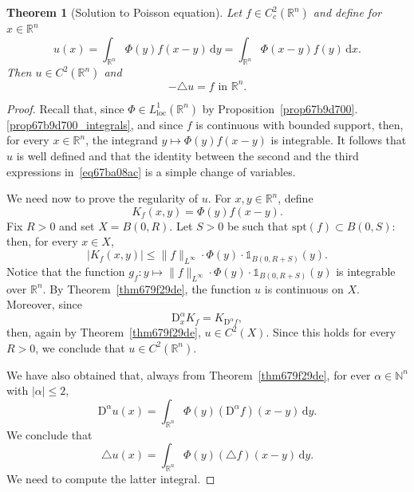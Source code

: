 \documentclass[a4paper,9pt]{amsart}
\newcommand{\N}{\mathbb{N}}	%
\newcommand{\R}{\mathbb{R}}	%
\newcommand{\did}{\,\mathrm{d}}	%
\newcommand{\Diff}{\mathrm{D}}
\newcommand{\spt}{\mathrm{spt}}
\newcommand{\loc}{\mathrm{loc}}
\newcommand{\laplacian}{\triangle}
\newcommand{\one}{{\mathds 1\!}}
\theoremstyle{plain}
\newtheorem{theorem}[proposition]{Theorem}
\theoremstyle{definition}
\theoremstyle{remark}
\begin{document}
\begin{theorem}[Solution to Poisson equation]\label{teo67ba14f2}
	Let $f\in C^2_c(\R^n)$ and define for $x\in\R^n$
	\begin{equation}\label{eq67ba08ac}
		u(x) = \int_{\R^n} \Phi(y) f(x-y) \did y = \int_{\R^n} \Phi(x-y) f(y) \did x  .
	\end{equation}
	Then $u\in C^2(\R^n)$ and 
	\begin{equation}\label{eq67ba14c8}
		-\laplacian u = f \text{ in }\R^n . 
	\end{equation}
\end{theorem}
\begin{proof}
	Recall that, since $\Phi\in L^1_\loc(\R^n)$ by 
	Proposition~\ref{prop67b9d700}.\ref{prop67b9d700_integrals},
	and since $f$ is continuous with bounded support, then, for every $x\in\R^n$, the integrand $y\mapsto \Phi(y)f(x-y)$ is integrable.
	It follows that $u$ is well defined and that the identity between the second and the third expressions in~\eqref{eq67ba08ac} is a simple change of variables.
	
	We need now to prove the regularity of $u$.
	For $x,y\in\R^n$, define
	\begin{equation}
		K_f(x,y) = \Phi(y) f(x-y).
	\end{equation}
	Fix $R>0$ and set $X=B(0,R)$. 
	Let $S>0$ be such that $\spt(f)\subset B(0,S)$: then, for every $x\in X$,
	\begin{equation}
		|K_f(x,y)| \le \|f\|_{L^\infty} \cdot \Phi(y) \cdot \one_{B(0,R+S)}(y) .
	\end{equation}
	Notice that the function $g_f:y\mapsto \|f\|_{L^\infty} \cdot \Phi(y) \cdot \one_{B(0,R+S)}(y)$ is integrable over $\R^n$.
	By Theorem~\ref{thm679f29de}, the function $u$ is continuous on $X$.
	Moreover, since 
	\[
	\Diff^\alpha_x K_f = K_{\Diff^\alpha f} ,
	\]
	then, again by Theorem~\ref{thm679f29de}, $u\in C^2(X)$.
	Since this holds for every $R>0$, we conclude that $u\in C^2(\R^n)$.
	
	We have also obtained that, always from Theorem~\ref{thm679f29de}, 
	for ever $\alpha\in\N^n$ with $|\alpha|\le 2$,
	\[
	\Diff^\alpha u(x) = \int_{\R^n} \Phi(y) (\Diff^\alpha f)(x-y) \did y .
	\]
	We conclude that
	\[
	\laplacian u(x) = \int_{\R^n} \Phi(y) (\laplacian f)(x-y) \did y .
	\]
	We need to compute the latter integral.
	

\end{proof}
\end{document}
